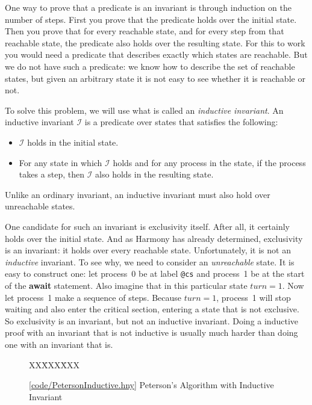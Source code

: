 \documentclass{report}
\newcommand{\harmonysource}[1]{
\begin{tabbing}
XX\=XXX\=XXX\kill
    
\end{tabbing}
}
\newcommand{\harmonylink}[1]{%
[\href{https://www.cs.cornell.edu/home/rvr/harmony/#1}{\underline{#1}}]%
}
\newenvironment{code}{
\tcolorbox
}{
\endtcolorbox
}
\begin{document}
One way to prove that a predicate is an invariant is through induction
on the number of steps.  First you prove that the predicate holds over
the initial state.  Then you prove that for every reachable state,
and for every step from that reachable state, the predicate also holds
over the resulting state.
For this to work you would need a predicate that describes exactly which
states are reachable.
But we do not have such a predicate: we know how to describe the set
of reachable states, but given an arbitrary state it is not easy to
see whether it is reachable or not.

To solve this problem, we will use what is called an
\emph{inductive invariant}.
%
An inductive invariant $\mathcal{I}$ is a predicate over states that satisfies the following:
\begin{itemize}
\item $\mathcal{I}$ holds in the initial state.
\item For any state in which $\mathcal{I}$ holds and for any process in the
state, if the process takes a step, then $\mathcal{I}$ also holds in the resulting state.
\end{itemize}
Unlike an ordinary invariant, an inductive invariant must also hold over unreachable states.

One candidate for such an invariant is exclusivity itself.
After all, it certainly holds over the initial state.
And as Harmony has already determined, exclusivity is an invariant:
it holds over every reachable state.
Unfortunately, it is not an \emph{inductive} invariant.
To see why, we need to consider an \emph{unreachable} state.
It is easy to construct one: let process~0 be at label \texttt{@cs}
and process~1 be at the start of the \textbf{await} statement.
Also imagine that in this particular state $\mathit{turn} = 1$.  Now let
process~1 make a sequence of steps.  Because $\mathit{turn} = 1$,
process~1 will stop waiting and also enter the critical
section, entering a state that is not exclusive.
So exclusivity is an invariant, but not an inductive invariant.
Doing a inductive proof with an invariant that is not inductive is usually
much harder than doing one with an invariant that is.

\begin{figure}
\begin{code}
\harmonysource{PetersonInductive}
\end{code}
\caption{\harmonylink{code/PetersonInductive.hny} Peterson's Algorithm with Inductive Invariant}
\label{fig:petersonproof}
\end{figure}
\end{document}
